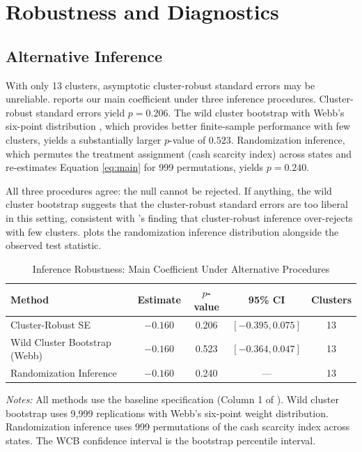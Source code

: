 \documentclass[12pt]{article}
\begin{document}
\section{Robustness and Diagnostics}

\subsection{Alternative Inference}

With only 13 clusters, asymptotic cluster-robust standard errors may be unreliable.  reports our main coefficient under three inference procedures. Cluster-robust standard errors yield $p = 0.206$. The wild cluster bootstrap with Webb's six-point distribution \citep{webb2022reworking, mackinnon2018wild}, which provides better finite-sample performance with few clusters, yields a substantially larger $p$-value of $0.523$. Randomization inference, which permutes the treatment assignment (cash scarcity index) across states and re-estimates Equation \ref{eq:main} for 999 permutations, yields $p = 0.240$.

All three procedures agree: the null cannot be rejected. If anything, the wild cluster bootstrap suggests that the cluster-robust standard errors are too liberal in this setting, consistent with \citet{cameron2008bootstrap}'s finding that cluster-robust inference over-rejects with few clusters.  plots the randomization inference distribution alongside the observed test statistic.

\begin{table}[H]
\centering
\caption{Inference Robustness: Main Coefficient Under Alternative Procedures}
\begin{threeparttable}
\begin{tabular}{lcccc}
\toprule
Method & Estimate & $p$-value & 95\% CI & Clusters \\
\midrule
Cluster-Robust SE & $-0.160$ & 0.206 & $[-0.395, 0.075]$ & 13 \\
Wild Cluster Bootstrap (Webb) & $-0.160$ & 0.523 & $[-0.364, 0.047]$ & 13 \\
Randomization Inference & $-0.160$ & 0.240 & --- & 13 \\
\bottomrule
\end{tabular}
\begin{tablenotes}[flushleft]
\small
\item \textit{Notes:} All methods use the baseline specification (Column 1 of ). Wild cluster bootstrap uses 9,999 replications with Webb's six-point weight distribution. Randomization inference uses 999 permutations of the cash scarcity index across states. The WCB confidence interval is the bootstrap percentile interval.
\end{tablenotes}
\end{threeparttable}
\label{tab:inference}
\end{table}
\end{document}
